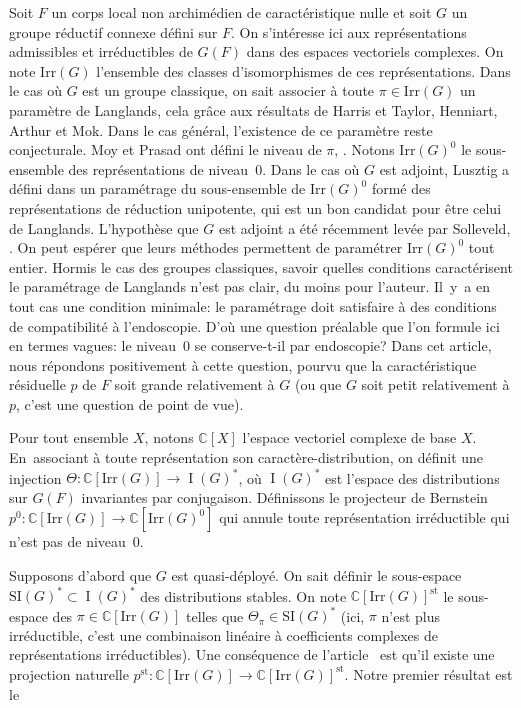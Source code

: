 \documentclass[JEP,XML,SOM,Unicode,francais]{cedram}
\newcommand{\Irr}{\mathrm{Irr}}
\newcommand{\SI}{\mathrm{SI}}
\newcommand{\st}{\mathrm{st}}
\DeclareMathOperator{\rI}{I}
\newcommand{\CC}{\mathbb{C}}
\theoremstyle{plain}
\theoremstyle{definition}
\begin{document}
Soit $F$ un corps local non archimédien de caractéristique nulle et soit $G$ un groupe réductif connexe défini sur $F$. On s'intéresse ici aux représentations admissibles et irréductibles de $G(F)$ dans des espaces vectoriels complexes. On note $\Irr(G)$ l'ensemble des classes d'isomorphismes de ces représentations. Dans le cas où $G$ est un groupe classique, on sait associer à toute $\pi\in \Irr(G)$ un paramètre de Langlands, cela grâce aux résultats de Harris et Taylor, Henniart, Arthur et Mok. Dans le cas général, l'existence de ce paramètre reste conjecturale.
Moy et Prasad ont défini le niveau de $\pi$, \cf \cite[Th.\,5.2]{MP1}. Notons $\Irr(G)^0$ le sous-ensemble des représentations de niveau~$0$. Dans le cas où $G$ est adjoint, Lusztig a défini dans \cite{Lu} un paramétrage du sous-ensemble de $\Irr(G)^0$ formé des représentations de réduction unipotente, qui est un bon candidat pour être celui de Langlands. L'hypothèse que $G$ est adjoint a été récemment levée par Solleveld, \cf \cite{S}. On peut espérer que leurs méthodes permettent de paramétrer $\Irr(G)^0$ tout entier.
Hormis le cas des groupes classiques, savoir quelles conditions caractérisent le paramétrage de Langlands n'est pas clair, du moins pour l'auteur. Il~y~a en tout cas une condition minimale: le paramétrage doit satisfaire à des conditions de compatibilité à l'endoscopie. D'où une question préalable que l'on formule ici en termes vagues: le niveau~$0$ se conserve-t-il par endoscopie? Dans cet article, nous répondons positivement à cette question, pourvu que la caractéristique résiduelle $p$ de $F$ soit grande relativement à $G$ (ou que $G$ soit petit relativement à $p$, c'est une question de point de vue).

Pour tout ensemble $X$, notons $\CC[X]$ l'espace vectoriel complexe de base $X$. En~associant à toute représentation son caractère-distribution, on définit une injection $\Theta:\CC[\Irr(G)] \to \rI(G)^*$, où $\rI(G)^*$ est l'espace des distributions sur $G(F)$ invariantes par conjugaison. Définissons le projecteur de Bernstein $p^0:\CC[\Irr(G)]\to \CC[\Irr(G)^0]$ qui annule toute représentation irréductible qui n'est pas de niveau~$0$.

Supposons d'abord que $G$ est quasi-déployé. On sait définir le sous-espace $\SI(G)^*\subset \rI(G)^*$ des distributions stables. On note $\CC[\Irr(G)]^{\st}$ le sous-espace des $\pi\in \CC[\Irr(G)]$ telles que $\Theta_{\pi}\in \SI(G)^*$ (ici, $\pi$ n'est plus irréductible, c'est une combinaison linéaire à coefficients complexes de représentations irréductibles). Une conséquence de l'arti\-cle~\cite{A3} est qu'il existe une projection naturelle $p^{\st}:\CC[\Irr(G)]\to \CC[\Irr(G)]^{\st}$. Notre premier résultat est le
\end{document}
